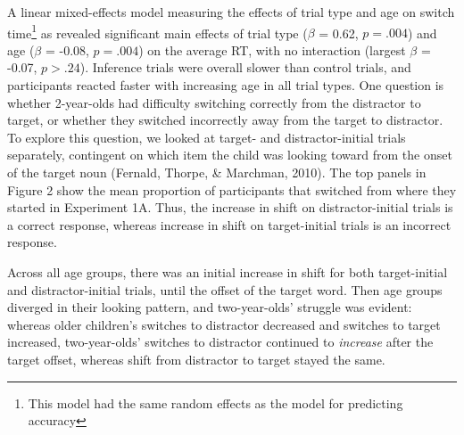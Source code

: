 \documentclass[a4paper,man,apacite,floatsintext]{apa6}
\begin{document}
A linear mixed-effects model measuring the effects of trial type and age
on switch time\footnote{This model had the same random effects as the
  model for predicting accuracy} as revealed significant main effects of
trial type (\(\beta\) = 0.62, \(p =.004\)) and age (\(\beta\) = -0.08,
\(p =.004\)) on the average RT, with no interaction (largest \(\beta\) =
-0.07, \(p >.24\)). Inference trials were overall slower than control
trials, and participants reacted faster with increasing age in all trial
types. One question is whether 2-year-olds had difficulty switching
correctly from the distractor to target, or whether they switched
incorrectly away from the target to distractor. To explore this
question, we looked at target- and distractor-initial trials separately,
contingent on which item the child was looking toward from the onset of
the target noun (Fernald, Thorpe, \& Marchman, 2010). The top panels in
Figure 2 show the mean proportion of participants that switched from
where they started in Experiment 1A. Thus, the increase in shift on
distractor-initial trials is a correct response, whereas increase in
shift on target-initial trials is an incorrect response.

Across all age groups, there was an initial increase in shift for both
target-initial and distractor-initial trials, until the offset of the
target word. Then age groups diverged in their looking pattern, and
two-year-olds' struggle was evident: whereas older children's switches
to distractor decreased and switches to target increased, two-year-olds'
switches to distractor continued to \emph{increase} after the target
offset, whereas shift from distractor to target stayed the same.
\end{document}
